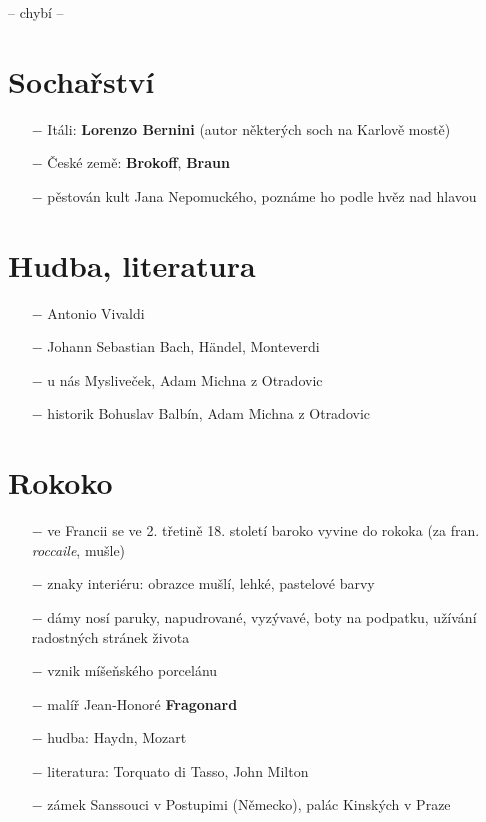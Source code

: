 \documentclass{article}
\begin{document}
-- chybí --

\section*{Sochařství}
\begin{itemize}
    \vspace{-0.5em}
    \setlength\itemsep{0.15em}
    \item[$-$] Itáli: \textbf{Lorenzo Bernini} (autor některých soch na Karlově mostě)
    \item[$-$] České země: \textbf{Brokoff}, \textbf{Braun}
    \item[$-$] pěstován kult Jana Nepomuckého, poznáme ho podle hvěz nad hlavou
\end{itemize}

\section*{Hudba, literatura}
\begin{itemize}
    \vspace{-0.5em}
    \setlength\itemsep{0.15em}
    \item[$-$] Antonio Vivaldi
    \item[$-$] Johann Sebastian Bach, Händel, Monteverdi
    \item[$-$] u nás Mysliveček, Adam Michna z Otradovic
    \item[$-$] historik Bohuslav Balbín, Adam Michna z Otradovic
\end{itemize}

\section*{Rokoko}
\begin{itemize}
    \vspace{-0.5em}
    \setlength\itemsep{0.15em}
    \item[$-$] ve Francii se ve 2. třetině 18. století baroko vyvine do rokoka (za fran. \textit{roccaile}, mušle)
    \item[$-$] znaky interiéru: obrazce mušlí, lehké, pastelové barvy
    \item[$-$] dámy nosí paruky, napudrované, vyzývavé, boty na podpatku, užívání radostných stránek života
    \item[$-$] vznik míšeňského porcelánu
    \item[$-$] malíř Jean-Honoré \textbf{Fragonard}
    \item[$-$] hudba: Haydn, Mozart
    \item[$-$] literatura: Torquato di Tasso, John Milton
    \item[$-$] zámek Sanssouci v Postupimi (Německo), palác Kinských v Praze
\end{itemize}
\end{document}
